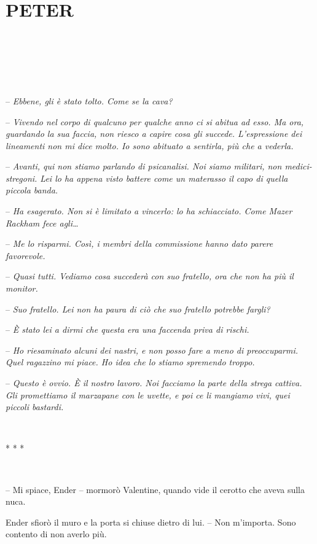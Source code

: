\chapter{PETER}

{~}

{~}

{~}

{-- \emph{Ebbene, gli è stato tolto. Come se la cava?}}

{-- \emph{Vivendo nel corpo di qualcuno per qualche anno ci si abitua ad
		esso. Ma ora, guardando la sua faccia, non riesco a capire cosa gli
		succede. L'espressione dei lineamenti non mi dice molto. Io sono
		abituato a sentirla, più che a vederla.}}

{-- \emph{Avanti, qui non stiamo parlando di psicanalisi. Noi siamo
		militari, non medici-stregoni. Lei lo ha appena visto battere come un
		materasso il capo di quella piccola banda.}}

{-- \emph{Ha esagerato. Non si è limitato a vincerlo: lo ha schiacciato.
		Come Mazer Rackham fece agli\ldots{}}}

{-- \emph{Me lo risparmi. Così, i membri della commissione hanno dato
		parere favorevole.}}

{-- \emph{Quasi tutti. Vediamo cosa succederà con suo fratello, ora che
		non ha più il monitor.}}

{-- \emph{Suo fratello. Lei non ha paura di ciò che suo fratello
		potrebbe fargli?}}

{-- \emph{È stato lei a dirmi che questa era una faccenda priva di
		rischi.}}

{-- \emph{Ho riesaminato alcuni dei nastri, e non posso fare a meno di
		preoccuparmi. Quel ragazzino mi piace. Ho idea che lo stiamo spremendo
		troppo.}}

{-- \emph{Questo è ovvio. È il nostro lavoro. Noi facciamo la parte
		della strega cattiva. Gli promettiamo il marzapane con le uvette, e poi
		ce li mangiamo vivi, quei piccoli bastardi.}}

{~}

\begin{center}
	{* * *}
\end{center}

{~}

{-- Mi spiace, Ender -- mormorò Valentine, quando vide il cerotto che
	aveva sulla nuca.}

{Ender sfiorò il muro e la porta si chiuse dietro di lui. -- Non
	m'importa. Sono contento di non averlo più.}

